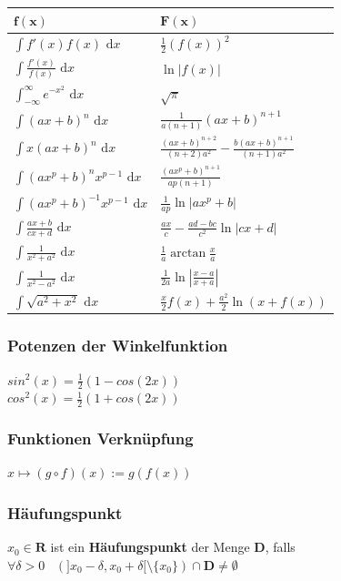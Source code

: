 \documentclass[8pt]{extarticle}
\def\dx{\text{ d}x}
\begin{document}
\begin{multicols*}{3}
\begin{center}
\begin{tabularx}{\linewidth}{>{\centering\arraybackslash}X>{\centering\arraybackslash}X}
  $\mathbf{f(x)}$ & $\mathbf{F(x)}$ \\
  \midrule
  $\int f'(x) f(x) \dx$ & $\frac{1}{2}(f(x))^2$ \\
  $\int \frac{f'(x)}{f(x)} \dx$ & $\ln|f(x)|$ \\
  $\int_{-\infty}^\infty e^{-x^2} \dx$ & $\sqrt{\pi}$ \\
  $\int (ax+b)^n \dx$ & $\frac{1}{a(n+1)}(ax+b)^{n+1}$ \\
  $\int x(ax+b)^n \dx$ & $\frac{(ax+b)^{n+2}}{(n+2)a^2} - \frac{b(ax+b)^{n+1}}{(n+1)a^2}$ \\
  $\int (ax^p+b)^n x^{p-1} \dx$ & $\frac{(ax^p+b)^{n+1}}{ap(n+1)}$ \\
  $\int (ax^p + b)^{-1} x^{p-1} \dx$ & $\frac{1}{ap} \ln |ax^p + b|$ \\
  $\int \frac{ax+b}{cx+d} \dx$ & $\frac{ax}{c} - \frac{ad-bc}{c^2} \ln |cx +d|$ \\
  $\int \frac{1}{x^2+a^2} \dx$ & $\frac{1}{a} \arctan \frac{x}{a}$ \\
  $\int \frac{1}{x^2 - a^2} \dx$ & $\frac{1}{2a} \ln\left| \frac{x-a}{x+a} \right|$ \\
  $\int \sqrt{a^2+x^2} \dx $ & $\frac{x}{2}f(x) + \frac{a^2}{2}\ln(x+f(x))$ \\
  \bottomrule
 \end{tabularx}
\end{center}

    \subsubsection {Potenzen der Winkelfunktion}
  
  $sin^2(x) = \frac{1}{2} (1 - cos(2x))$\\
  $cos^2(x) = \frac{1}{2} (1 + cos(2x))$

    \subsubsection {Funktionen Verknüpfung}
  
  $
    x \mapsto (g \circ f)(x) := g(f(x))
  $

    \subsubsection {Häufungspunkt}
  
  $x_0 \in \mathbf{R}$ ist ein \textbf{Häufungspunkt} der Menge $\mathbf{D}$,
  falls $\forall \delta > 0 \;\;\; (]x_0 - \delta, x_0 + \delta[ \setminus \{x_0\}) \cap \mathbf{D} \neq \emptyset$


\end{multicols*}
\end{document}
